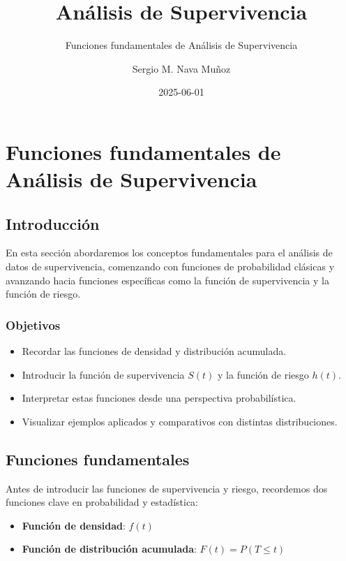 \documentclass[
  letterpaper,
  DIV=11,
  numbers=noendperiod]{scrartcl}
\title{Análisis de Supervivencia}
\subtitle{Funciones fundamentales de Análisis de Supervivencia}
\author{Sergio M. Nava Muñoz}
\date{2025-06-01}
\providecommand{\tightlist}{%
  \setlength{\itemsep}{0pt}\setlength{\parskip}{0pt}}
\begin{document}
\maketitle


\section{Funciones fundamentales de Análisis de
Supervivencia}\label{funciones-fundamentales-de-anuxe1lisis-de-supervivencia}

\subsection{Introducción}\label{introducciuxf3n}

En esta sección abordaremos los conceptos fundamentales para el análisis
de datos de supervivencia, comenzando con funciones de probabilidad
clásicas y avanzando hacia funciones específicas como la función de
supervivencia y la función de riesgo.

\subsubsection{Objetivos}\label{objetivos}

\begin{itemize}
\tightlist
\item
  Recordar las funciones de densidad y distribución acumulada.
\item
  Introducir la función de supervivencia \(S(t)\) y la función de riesgo
  \(h(t)\).
\item
  Interpretar estas funciones desde una perspectiva probabilística.
\item
  Visualizar ejemplos aplicados y comparativos con distintas
  distribuciones.
\end{itemize}

\subsection{Funciones fundamentales}\label{funciones-fundamentales}

Antes de introducir las funciones de supervivencia y riesgo, recordemos
dos funciones clave en probabilidad y estadística:

\begin{itemize}
\tightlist
\item
  \textbf{Función de densidad}: \(f(t)\)
\item
  \textbf{Función de distribución acumulada}: \(F(t) = P(T \leq t)\)
\end{itemize}
\end{document}
